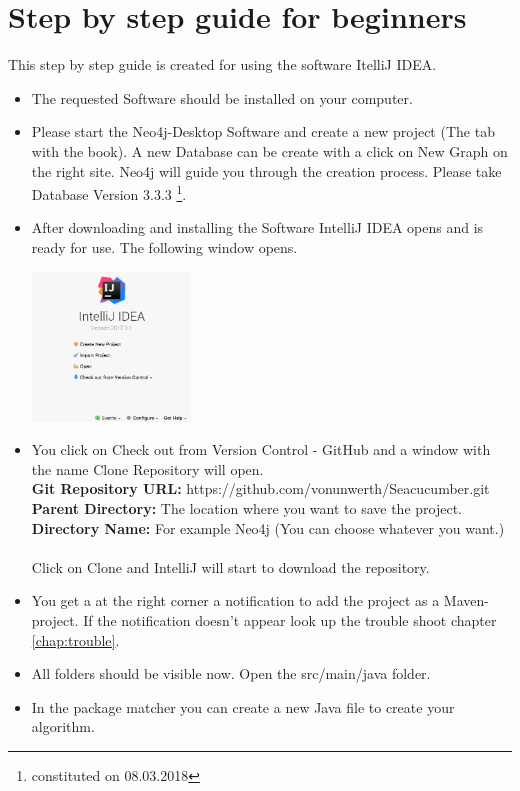 \section{Step by step guide for beginners}\label{sec:stepByStepManualNew}
This step by step guide is created for using the software \glqq ItelliJ IDEA\grqq{}.
\begin{itemize}
	\item The requested Software should be installed on your computer.
	\item Please start the Neo4j-Desktop Software and create a new project (The tab with the book). A new Database can be create with a click on New Graph on the right site. Neo4j will guide you through the creation process. Please take Database Version 3.3.3 \footnote{constituted on 08.03.2018}.
	\item After downloading and installing the Software \glqq IntelliJ IDEA\grqq{} opens and is ready for use. The following window opens. \newpage
	\begin{center}
		\includegraphics[width=4.2cm]{common/IntelliJstart.png}\setlength{\unitlength}{1mm}
	\end{center}
	
	\item You click on \glqq Check out from Version Control - GitHub\grqq{} and a window with the name \glqq Clone Repository\grqq{} will open. \\
	\textbf{Git Repository URL:} https://github.com/vonunwerth/Seacucumber.git \\
	\textbf{Parent Directory:} The location where you want to save the project.  \\
	\textbf{Directory Name:} For example Neo4j (You can choose whatever you want.)\\
	\\
	Click on Clone and IntelliJ will start to download the repository.
	
	\item You get a at the right corner a notification to add the project as a Maven-project. If the notification doesn't appear look up the trouble shoot chapter \ref{chap:trouble}.
	
	\item All folders should be visible now. Open the src/main/java folder.
	\item In the \glqq package matcher\grqq{} you can create a new Java file to create your algorithm.
\end{itemize}

